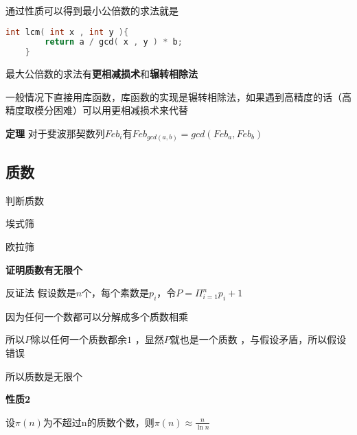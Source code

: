 通过性质可以得到最小公倍数的求法就是
\begin{lstlisting}[language = c]
    int lcm( int x , int y ){
        return a / gcd( x , y ) * b;
    }
\end{lstlisting}
最大公倍数的求法有\textbf{更相减损术}和\textbf{辗转相除法}



一般情况下直接用库函数，库函数的实现是辗转相除法，如果遇到高精度的话（高精度取模分困难）可以用更相减损术来代替

\textbf{定理} 对于斐波那契数列$Feb_i$有$Feb_{gcd(a,b)}=gcd(Feb_a , Feb_b)$

\subsection{质数}
判断质数

埃式筛

欧拉筛


\textbf{证明质数有无限个}

反证法 假设数是$n$个，每个素数是$p_i$，令$P = \Pi_{i=1}^{n} p_i + 1$

因为任何一个数都可以分解成多个质数相乘

所以$P$除以任何一个质数都余$1$ ，显然$P$就也是一个质数 ，与假设矛盾，所以假设错误

所以质数是无限个

\textbf{性质2}

设$\pi(n)$为不超过n的质数个数，则$\pi(n) \approx \frac{n}{\ln{n}}$


